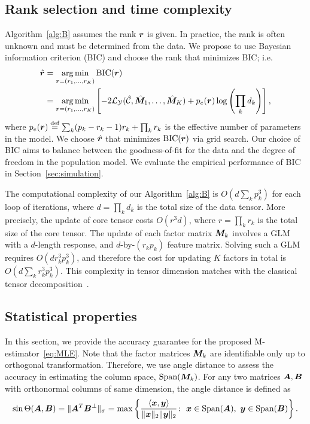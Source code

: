 \documentclass[12pt]{article}
\theoremstyle{definition}
\theoremstyle{definition}
\begin{document}
\subsection{Rank selection and time complexity}\label{sec:tuning}
Algorithm~\ref{alg:B} assumes the rank $\bm{r}$ is given. In practice, the rank is often unknown and must be determined from the data. We propose to use Bayesian information criterion (BIC) and choose the rank that minimizes BIC; i.e.
\begin{align}\label{eq:BIC}
\hat {\bm{r}}&=\operatorname*{arg\,min}_{\bm{r}=(r_1,\ldots,r_K)} \textup{BIC}(\bm{r})\notag\\
&=\operatorname*{arg\,min}_{\bm{r}=(r_1,\ldots,r_K)}\left[-2\mathcal{L}_{\mathcal{Y}}(\hat {\mathcal{C}}, \hat {\bm M}_1,\ldots,\hat {\bm M}_K)+p_e(\bm{r})\log \left(\prod_k d_k\right) \right],
\end{align}
where $p_e(\bm{r})\stackrel{\textup{def}}{=}\sum_k (p_k-r_k-1)r_k+\prod_k r_k$ is the effective number of parameters in the model. We choose $\hat {\bm{r}}$ that minimizes $\textup{BIC}(\bm{r})$ via grid search. Our choice of BIC aims to balance between the goodness-of-fit for the data and the degree of freedom in the population model. We evaluate the empirical performance of BIC in Section~\ref{sec:simulation}.  

The computational complexity of our Algorithm~\eqref{alg:B} is $O\left(d \sum_k p^3_k\right)$ for each loop of iterations, where $d=\prod_k d_k$ is the total size of the data tensor. More precisely, the update of core tensor costs $O(r^3d)$, where $r=\prod_k r_k$ is the total size of the core tensor. The update of each factor matrix $\bm M_k$ involves a GLM with a $d$-length response, and $d$-by-$(r_kp_k)$ feature matrix. Solving such a GLM requires $O(dr^3_kp^3_k)$, and therefore the cost for updating $K$ factors in total is $O( d\sum_k r^3_k p_k^3)$. This complexity in tensor dimension matches with the classical tensor decomposition~\citep{kolda2009tensor}. 



\subsection{Statistical properties}\label{subsec:statprob}
In this section, we provide the accuracy guarantee for the proposed M-estimator~\eqref{eq:MLE}. Note that the factor matrices $\bm M_k$ are identifiable only up to orthogonal transformation. Therefore, we use angle distance to assess the accuracy in estimating the column space, $\textup{Span}(\bm M_k)$. For any two matrices $\bm A,\bm B$ with orthonormal columns of same dimension, the angle distance is defined as
\[
\sin \Theta(\bm A,\bm B)=\lVert\bm A^T \bm B^{\perp}\rVert_\sigma=\max\left\{ \frac{\langle \bm x, \bm{y}\rangle}{\lVert\bm x\rVert_2\lVert\bm{y}\rVert_2}\colon \ \bm x\in \textup{Span}(\bm A),\ \bm{y}\in \textup{Span}(\bm B)\right\}.
\]
\end{document}
